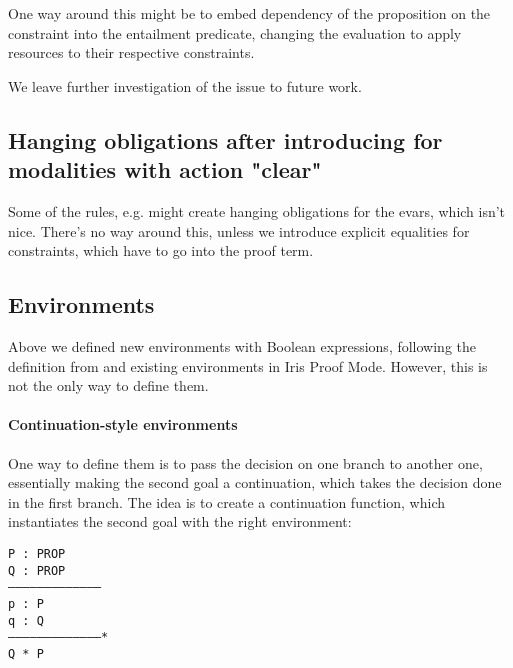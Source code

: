 {One way around this might be to embed dependency of the proposition on the constraint into the entailment predicate, changing the evaluation to apply resources to their respective constraints.

We leave further investigation of the issue to future work.


\subsection{Hanging obligations after introducing for modalities with action "clear"}
\label{subsec:hanging-obligations}

Some of the rules, e.g.  might create hanging obligations for the evars, which isn't nice.
There's no way around this, unless we introduce explicit equalities for constraints, which have to go into the proof term.

\subsection{Environments}
\label{subsec:environments}

Above we defined new environments with Boolean expressions, following the definition from \citeauthor{harlandResourceDistributionBooleanConstraints2003} and existing environments in Iris Proof Mode.
However, this is not the only way to define them.

\paragraph{Continuation-style environments}

One way to define them is to pass the decision on one branch to another one, essentially making the second goal a continuation, which takes the decision done in the first branch.
The idea is to create a continuation function, which instantiates the second goal with the right environment:
\begin{minipage}{\linewidth}
\texttt{P : PROP\\
Q : PROP\\
---------------------------------------\\
p : P\\
q : Q\\
---------------------------------------*\\
Q * P
}
\end{minipage}

}
